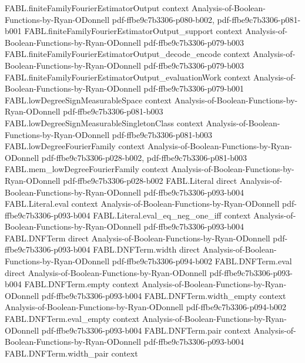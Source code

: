 \begin{theorem}
\proofstep
  {FABL.finiteFamilyFourierEstimatorOutput}
  {context}
  {Analysis-of-Boolean-Functions-by-Ryan-ODonnell}
  {pdf-ffbe9c7b3306-p080-b002,
    pdf-ffbe9c7b3306-p081-b001}
\proofstep
  {FABL.finiteFamilyFourierEstimatorOutput_support}
  {context}
  {Analysis-of-Boolean-Functions-by-Ryan-ODonnell}
  {pdf-ffbe9c7b3306-p079-b003}
\proofstep
  {FABL.finiteFamilyFourierEstimatorOutput_decode_encode}
  {context}
  {Analysis-of-Boolean-Functions-by-Ryan-ODonnell}
  {pdf-ffbe9c7b3306-p079-b003}
\proofstep
  {FABL.finiteFamilyFourierEstimatorOutput_evaluationWork}
  {context}
  {Analysis-of-Boolean-Functions-by-Ryan-ODonnell}
  {pdf-ffbe9c7b3306-p079-b001}
\proofstep
  {FABL.lowDegreeSignMeasurableSpace}
  {context}
  {Analysis-of-Boolean-Functions-by-Ryan-ODonnell}
  {pdf-ffbe9c7b3306-p081-b003}
\proofstep
  {FABL.lowDegreeSignMeasurableSingletonClass}
  {context}
  {Analysis-of-Boolean-Functions-by-Ryan-ODonnell}
  {pdf-ffbe9c7b3306-p081-b003}
\proofstep
  {FABL.lowDegreeFourierFamily}
  {context}
  {Analysis-of-Boolean-Functions-by-Ryan-ODonnell}
  {pdf-ffbe9c7b3306-p028-b002,
    pdf-ffbe9c7b3306-p081-b003}
\proofstep
  {FABL.mem_lowDegreeFourierFamily}
  {context}
  {Analysis-of-Boolean-Functions-by-Ryan-ODonnell}
  {pdf-ffbe9c7b3306-p028-b002}
\proofstep
  {FABL.Literal}
  {direct}
  {Analysis-of-Boolean-Functions-by-Ryan-ODonnell}
  {pdf-ffbe9c7b3306-p093-b004}
\proofstep
  {FABL.Literal.eval}
  {context}
  {Analysis-of-Boolean-Functions-by-Ryan-ODonnell}
  {pdf-ffbe9c7b3306-p093-b004}
\proofstep
  {FABL.Literal.eval_eq_neg_one_iff}
  {context}
  {Analysis-of-Boolean-Functions-by-Ryan-ODonnell}
  {pdf-ffbe9c7b3306-p093-b004}
\proofstep
  {FABL.DNFTerm}
  {direct}
  {Analysis-of-Boolean-Functions-by-Ryan-ODonnell}
  {pdf-ffbe9c7b3306-p093-b004}
\proofstep
  {FABL.DNFTerm.width}
  {direct}
  {Analysis-of-Boolean-Functions-by-Ryan-ODonnell}
  {pdf-ffbe9c7b3306-p094-b002}
\proofstep
  {FABL.DNFTerm.eval}
  {direct}
  {Analysis-of-Boolean-Functions-by-Ryan-ODonnell}
  {pdf-ffbe9c7b3306-p093-b004}
\proofstep
  {FABL.DNFTerm.empty}
  {context}
  {Analysis-of-Boolean-Functions-by-Ryan-ODonnell}
  {pdf-ffbe9c7b3306-p093-b004}
\proofstep
  {FABL.DNFTerm.width_empty}
  {context}
  {Analysis-of-Boolean-Functions-by-Ryan-ODonnell}
  {pdf-ffbe9c7b3306-p094-b002}
\proofstep
  {FABL.DNFTerm.eval_empty}
  {context}
  {Analysis-of-Boolean-Functions-by-Ryan-ODonnell}
  {pdf-ffbe9c7b3306-p093-b004}
\proofstep
  {FABL.DNFTerm.pair}
  {context}
  {Analysis-of-Boolean-Functions-by-Ryan-ODonnell}
  {pdf-ffbe9c7b3306-p093-b004}
\proofstep
  {FABL.DNFTerm.width_pair}
  {context}

\end{theorem}
